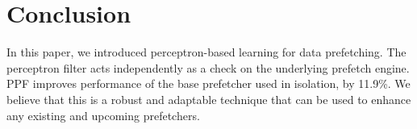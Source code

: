 \section{Conclusion}
\label{Conclusion}
In this paper, we introduced perceptron-based learning for data prefetching.
The perceptron filter acts independently as a check on the underlying prefetch
engine.  PPF improves performance of the base prefetcher used in isolation, 
by 11.9\%.  We believe that this is a robust and adaptable technique 
that can be used to enhance any existing and upcoming prefetchers.

